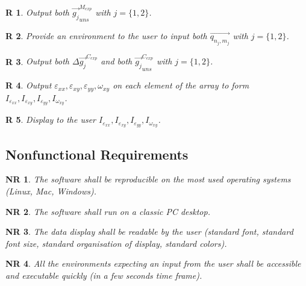 \documentclass[12pt]{article}
\newtheorem{R}{R}
\newtheorem{NR}{NR}
\begin{document}
\begin{R}
\label{R_10}
\normalfont Output both $\overrightarrow{g_{j}}_{uns}^{M_{exp}}$ with $j=\{1,2\}$.
\end{R}
\begin{R}
\label{R_11}
\normalfont Provide an environment to the user to input both $\overrightarrow{q_{n_j,m_j}}$ with $j=\{1,2\}$.
\end{R}
\begin{R}
\label{R_12}
\normalfont Output both  $\Delta \overrightarrow{g_{j}}^{C_{exp}}$ and both $\overrightarrow{g_{j}}_{uns}^{C_{exp}}$ with $j=\{1,2\}$.
\end{R}
\begin{R}
\label{R_13}
\normalfont Output $\varepsilon_{xx},\varepsilon_{xy},\varepsilon_{yy},\omega_{xy}$ on each element of the array to form $I_{\varepsilon_{xx}},I_{\varepsilon_{xy}},I_{\varepsilon_{yy}},I_{\omega_{xy}}$.
\end{R}
\begin{R}
\label{R_14}
\normalfont Display to the user $I_{\varepsilon_{xx}},I_{\varepsilon_{xy}},I_{\varepsilon_{yy}},I_{\omega_{xy}}$.
\end{R}

\subsection{Nonfunctional Requirements}


\begin{NR}
\label{NR_1} 
\normalfont The software shall be reproducible on the most used operating systems (Linux, Mac, Windows).
\end{NR}

\begin{NR}
\label{NR_2} 
\normalfont The software shall run on a classic PC desktop.
\end{NR}

\begin{NR}
\label{NR_3} 
\normalfont The data display shall be readable by the user (standard font, standard font size, standard organisation of display, standard colors).
\end{NR}

\begin{NR}
\label{NR_4} 
\normalfont All the environments expecting an input from the user shall be accessible and executable quickly (in a few seconds time frame).
\end{NR}
\end{document}

